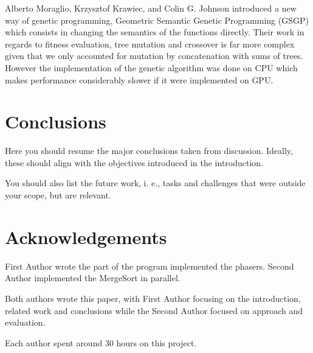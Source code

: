 \documentclass[runningheads]{llncs}
\begin{document}
Alberto Moraglio, Krzysztof Krawiec, and Colin G. Johnson introduced a new way of genetic programming, Geometric Semantic Genetic Programming (GSGP) which consists in changing the semantics of the functions directly. Their work in regards to fitness evaluation, tree mutation and crossover is far more complex given that we only accounted for mutation by concatenation with sums of trees. However the implementation of the genetic algorithm was done on CPU which makes performance considerably slower if it were implemented on GPU.


\section{Conclusions}

Here you should resume the major conclusions taken from discussion. Ideally, these should align with the objectives introduced in the introduction.


You should also list the future work, i. e., tasks and challenges that were outside your scope, but are relevant.

\section*{Acknowledgements}

First Author wrote the part of the program implemented the phasers. Second Author implemented the MergeSort in parallel. 

Both authors wrote this paper, with First Author focusing on the introduction, related work and conclusions while the Second Author focused on approach and evaluation.

Each author spent around 30 hours on this project.



\end{document}
